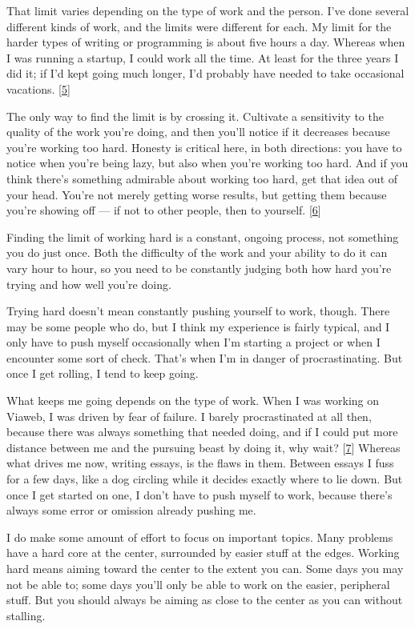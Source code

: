That limit varies depending on the type of work and the person. I've
done several different kinds of work, and the limits were different for
each. My limit for the harder types of writing or programming is about
five hours a day. Whereas when I was running a startup, I could work all
the time. At least for the three years I did it; if I'd kept going much
longer, I'd probably have needed to take occasional vacations.
{[}\hyperref[f5n]{5}{]}

The only way to find the limit is by crossing it. Cultivate a
sensitivity to the quality of the work you're doing, and then you'll
notice if it decreases because you're working too hard. Honesty is
critical here, in both directions: you have to notice when you're being
lazy, but also when you're working too hard. And if you think there's
something admirable about working too hard, get that idea out of your
head. You're not merely getting worse results, but getting them because
you're showing off --- if not to other people, then to yourself.
{[}\hyperref[f6n]{6}{]}

Finding the limit of working hard is a constant, ongoing process, not
something you do just once. Both the difficulty of the work and your
ability to do it can vary hour to hour, so you need to be constantly
judging both how hard you're trying and how well you're doing.

Trying hard doesn't mean constantly pushing yourself to work, though.
There may be some people who do, but I think my experience is fairly
typical, and I only have to push myself occasionally when I'm starting a
project or when I encounter some sort of check. That's when I'm in
danger of procrastinating. But once I get rolling, I tend to keep going.

What keeps me going depends on the type of work. When I was working on
Viaweb, I was driven by fear of failure. I barely procrastinated at all
then, because there was always something that needed doing, and if I
could put more distance between me and the pursuing beast by doing it,
why wait? {[}\hyperref[f7n]{7}{]} Whereas what drives me now, writing
essays, is the flaws in them. Between essays I fuss for a few days, like
a dog circling while it decides exactly where to lie down. But once I
get started on one, I don't have to push myself to work, because there's
always some error or omission already pushing me.

I do make some amount of effort to focus on important topics. Many
problems have a hard core at the center, surrounded by easier stuff at
the edges. Working hard means aiming toward the center to the extent you
can. Some days you may not be able to; some days you'll only be able to
work on the easier, peripheral stuff. But you should always be aiming as
close to the center as you can without stalling.

